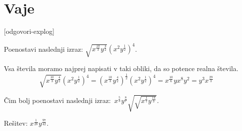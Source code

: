 \section{Vaje}
\label{sec:exp-log-vaje}


\def\datotekaOdgovori{odgovori-explog}

[\datotekaOdgovori]

%

\begin{vaja}
 Poenostavi naslednji izraz: \(\sqrt{x^{\frac{10}{3}}y^{\frac{4}{2}}}(x^{2}y^{\frac{1}{2}})^{4}\).

  \begin{odgovor}
   Vsa števila moramo najprej napisati v taki obliki, da so potence realna števila. 
	$$\sqrt{x^{\frac{10}{3}}y^{\frac{4}{2}}}(x^{2}y^{\frac{1}{2}})^{4}=(x^{\frac{10}{3}}y^{\frac{4}{2}})^{\frac{1}{2}}(x^{2}y^{\frac{1}{2}})^{4}=x^{\frac{10}{6}}yx^{8}y^{2}=y^{3}x^{\frac{29}{3}}$$
  \end{odgovor}
\end{vaja}

\begin{vaja}
  Čim bolj poenostavi naslednji izraz: \(\,x^{\frac{5}{3}}y^{\frac{8}{7}}\sqrt{\sqrt{x^{\frac{1}{7}}y^{\frac{14}{3}}}}\).

  \begin{odgovor}
   Rešitev: $x^{\frac{1}{28}} y^{\frac{97}{42}}$.
  \end{odgovor}
\end{vaja}

